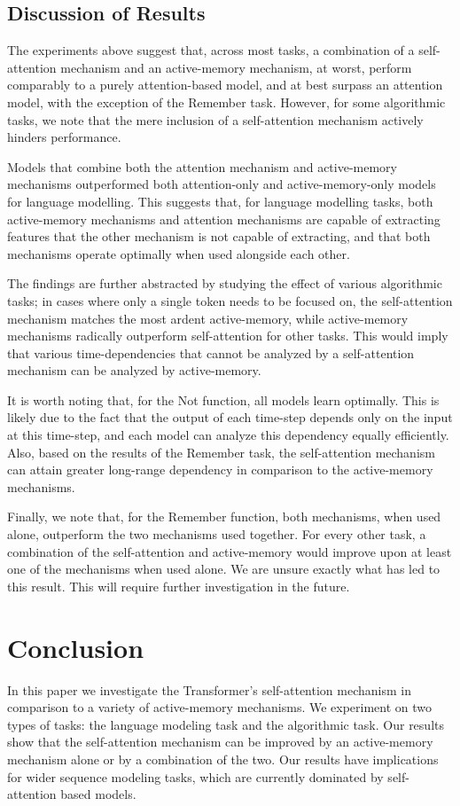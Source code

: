 \documentclass{article}
\begin{document}
\subsection{Discussion of Results}

The experiments above suggest that, across most tasks, a combination of a self-attention mechanism and an active-memory mechanism, at worst, perform comparably to a purely attention-based model, and at best surpass an attention model, with the exception of the Remember task. However, for some algorithmic tasks, we note that the mere inclusion of a self-attention mechanism actively hinders performance.

Models that combine both the attention mechanism and active-memory mechanisms outperformed both attention-only and active-memory-only models for language modelling. This suggests that, for language modelling tasks, both active-memory mechanisms and attention mechanisms are capable of extracting features that the other mechanism is not capable of extracting, and that both mechanisms operate optimally when used alongside each other.

The findings are further abstracted by studying the effect of various algorithmic tasks; in cases where only a single token needs to be focused on, the self-attention mechanism matches the most ardent active-memory, while active-memory mechanisms radically outperform self-attention for other tasks. This would imply that various time-dependencies that cannot be analyzed by a self-attention mechanism can be analyzed by active-memory.

It is worth noting that, for the Not function, all models learn optimally. This is likely due to the fact that the output of each time-step depends only on the input at this time-step, and each model can analyze this dependency equally efficiently. Also, based on the results of the Remember task, the self-attention mechanism can attain greater long-range dependency in comparison to the active-memory mechanisms.

Finally, we note that, for the Remember function, both mechanisms, when used alone, outperform the two mechanisms used together. For every other task, a combination of the self-attention and active-memory would improve upon at least one of the mechanisms when used alone. We are unsure exactly what has led to this result. This will require further investigation in the future. 

\section{Conclusion}
In this paper we investigate the Transformer’s self-attention mechanism in comparison to a variety of active-memory mechanisms. We experiment on two types of tasks: the language modeling task and the algorithmic task. Our results show that the self-attention mechanism can be improved by an active-memory mechanism alone or by a combination of the two. Our results have implications for wider sequence modeling tasks, which are currently dominated by self-attention based models. 
\end{document}
